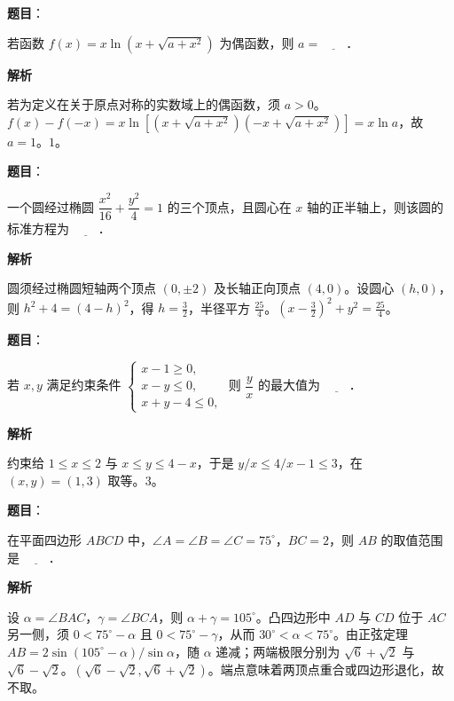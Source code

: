 \begin{answer}

\textbf{题目}：

若函数 $f(x)=x\ln\!\left(x+\sqrt{a+x^2}\right)$ 为偶函数，则 $a=\underline{\qquad}$．

\textbf{解析}

若为定义在关于原点对称的实数域上的偶函数，须 $a>0$。$f(x)-f(-x)=x\ln[(x+\sqrt{a+x^2})(-x+\sqrt{a+x^2})]=x\ln a$，故 $a=1$。$1$。


\end{answer}
\begin{answer}

\textbf{题目}：

一个圆经过椭圆 $\dfrac{x^2}{16}+\dfrac{y^2}{4}=1$ 的三个顶点，且圆心在 $x$ 轴的正半轴上，则该圆的标准方程为 $\underline{\qquad}$．

\textbf{解析}

圆须经过椭圆短轴两个顶点 $(0,\pm2)$ 及长轴正向顶点 $(4,0)$。设圆心 $(h,0)$，则 $h^2+4=(4-h)^2$，得 $h=\tfrac32$，半径平方 $\tfrac{25}{4}$。$(x-\tfrac32)^2+y^2=\tfrac{25}{4}$。


\end{answer}
\begin{answer}

\textbf{题目}：

若 $x,y$ 满足约束条件 $\begin{cases}x-1\geqslant0,\\x-y\leqslant0,\\x+y-4\leqslant0,\end{cases}$ 则 $\dfrac yx$ 的最大值为 $\underline{\qquad}$．

\textbf{解析}

约束给 $1\leqslant x\leqslant2$ 与 $x\leqslant y\leqslant4-x$，于是 $y/x\leqslant4/x-1\leqslant3$，在 $(x,y)=(1,3)$ 取等。$3$。


\end{answer}
\begin{answer}

\textbf{题目}：

在平面四边形 $ABCD$ 中，$\angle A=\angle B=\angle C=75^\circ$，$BC=2$，则 $AB$ 的取值范围是 $\underline{\qquad}$．

\textbf{解析}

设 $\alpha=\angle BAC$，$\gamma=\angle BCA$，则 $\alpha+\gamma=105^\circ$。凸四边形中 $AD$ 与 $CD$ 位于 $AC$ 另一侧，须 $0<75^\circ-\alpha$ 且 $0<75^\circ-\gamma$，从而 $30^\circ<\alpha<75^\circ$。由正弦定理 $AB=2\sin(105^\circ-\alpha)/\sin\alpha$，随 $\alpha$ 递减；两端极限分别为 $\sqrt6+\sqrt2$ 与 $\sqrt6-\sqrt2$。$(\sqrt6-\sqrt2,\sqrt6+\sqrt2)$。端点意味着两顶点重合或四边形退化，故不取。


\end{answer}
